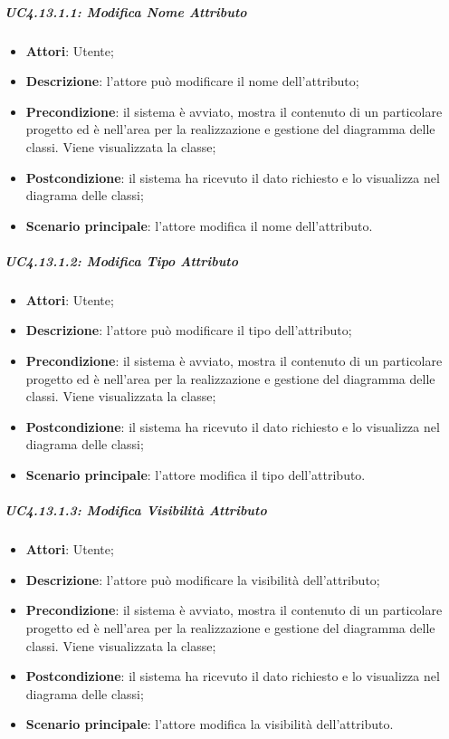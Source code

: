 \subparagraph{UC4.13.1.1: Modifica Nome Attributo}
\label{UC4.13.1.1}
\begin{itemize}
	\item \textbf{Attori}: Utente;
	\item \textbf{Descrizione}: l'attore può modificare il nome dell'attributo;
	\item \textbf{Precondizione}: il sistema è avviato, mostra il contenuto di un particolare progetto ed è nell'area per la realizzazione e gestione del diagramma delle classi. Viene visualizzata la classe;
	\item \textbf{Postcondizione}: il sistema ha ricevuto il dato richiesto e lo visualizza nel diagrama delle classi;
	\item \textbf{Scenario principale}: l'attore modifica il nome dell'attributo.
\end{itemize}

\subparagraph{UC4.13.1.2: Modifica Tipo Attributo}
\label{UC4.13.1.2}
\begin{itemize}
	\item \textbf{Attori}: Utente;
	\item \textbf{Descrizione}: l'attore può modificare il tipo dell'attributo;
	\item \textbf{Precondizione}: il sistema è avviato, mostra il contenuto di un particolare progetto ed è nell'area per la realizzazione e gestione del diagramma delle classi. Viene visualizzata la classe;
	\item \textbf{Postcondizione}: il sistema ha ricevuto il dato richiesto e lo visualizza nel diagrama delle classi;
	\item \textbf{Scenario principale}: l'attore modifica il tipo dell'attributo.
\end{itemize}

\subparagraph{UC4.13.1.3: Modifica Visibilità Attributo}
\label{UC4.13.1.3}
\begin{itemize}
	\item \textbf{Attori}: Utente;
	\item \textbf{Descrizione}: l'attore può modificare la visibilità dell'attributo;
	\item \textbf{Precondizione}: il sistema è avviato, mostra il contenuto di un particolare progetto ed è nell'area per la realizzazione e gestione del diagramma delle classi. Viene visualizzata la classe;
	\item \textbf{Postcondizione}: il sistema ha ricevuto il dato richiesto e lo visualizza nel diagrama delle classi;
	\item \textbf{Scenario principale}: l'attore modifica la visibilità dell'attributo.
\end{itemize}

